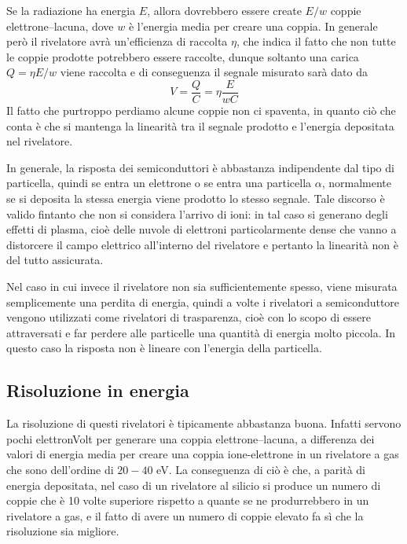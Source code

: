 Se la radiazione ha energia $E$, allora dovrebbero essere create $E/w$ coppie elettrone--lacuna, dove $w$ è l'energia media per creare una coppia. In generale però il rivelatore avrà un'efficienza di raccolta $\eta$, che indica il fatto che non tutte le coppie prodotte potrebbero essere raccolte, dunque soltanto una carica $Q=\eta E/w$ viene raccolta e di conseguenza il segnale misurato sarà dato da
\begin{equation*}
   V
   =\frac{Q}{C}
   =\eta \frac{E}{w C}
\end{equation*}
Il fatto che purtroppo perdiamo alcune coppie non ci spaventa, in quanto ciò che conta è che si mantenga la linearità tra il segnale prodotto e l'energia depositata nel rivelatore.

In generale, la risposta dei semiconduttori è abbastanza indipendente dal tipo di particella, quindi se entra un elettrone o se entra una particella $\alpha$, normalmente se si deposita la stessa energia viene prodotto lo stesso segnale. Tale discorso è valido fintanto che non si considera l'arrivo di ioni: in tal caso si generano degli effetti di plasma, cioè delle nuvole di elettroni particolarmente dense che vanno a distorcere il campo elettrico all'interno del rivelatore e pertanto la linearità non è del tutto assicurata.

Nel caso in cui invece il rivelatore non sia sufficientemente spesso, viene misurata semplicemente una perdita di energia, quindi a volte i rivelatori a semiconduttore vengono utilizzati come rivelatori di trasparenza, cioè con lo scopo di essere attraversati e far perdere alle particelle una quantità di energia molto piccola. In questo caso la risposta non è lineare con l'energia della particella.

\subsection{Risoluzione in energia}
La risoluzione di questi rivelatori è tipicamente abbastanza buona. Infatti servono pochi elettronVolt per generare una coppia elettrone--lacuna, a differenza dei valori di energia media per creare una coppia ione-elettrone in un rivelatore a gas che sono dell'ordine di $20-40$ eV. La conseguenza di ciò è che, a parità di energia depositata, nel caso di un rivelatore al silicio si produce un numero di coppie che è 10 volte superiore rispetto a quante se ne produrrebbero in un rivelatore a gas, e il fatto di avere un numero di coppie elevato fa sì che la risoluzione sia migliore.

